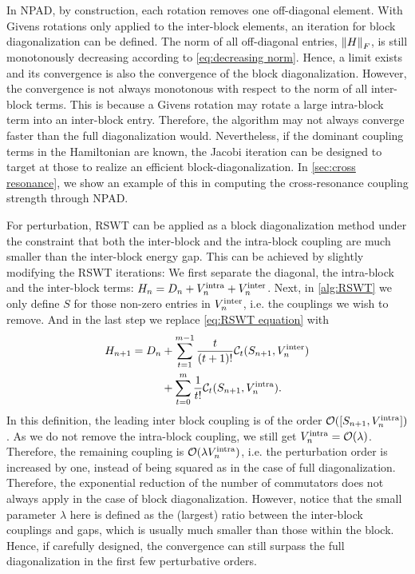 \documentclass[%
 reprint,
 amsmath,amssymb,
 aps,
pra,
noeprint,
superscriptaddress,
]{revtex4-2}
\begin{document}
In NPAD, by construction, each rotation removes one off-diagonal element.
With Givens rotations only applied to the inter-block elements, an iteration for block diagonalization can be defined.
The norm of all off-diagonal entries, $\norm{H}_F$, is still monotonously decreasing according to \cref{eq:decreasing norm}.
Hence, a limit exists and its convergence is also the convergence of the block diagonalization.
However, the convergence is not always monotonous with respect to the norm of all inter-block terms.
This is because a Givens rotation may rotate a large intra-block term into an inter-block entry.
Therefore, the algorithm may not always converge faster than the full diagonalization would.
Nevertheless, if the dominant coupling terms in the Hamiltonian are known, the Jacobi iteration can be designed to target at those to realize an efficient block-diagonalization.
In \cref{sec:cross resonance}, we show an example of this in computing the cross-resonance coupling strength through NPAD.


For perturbation, RSWT can be applied as a block diagonalization method under the constraint that both the inter-block and the intra-block coupling are much smaller than the inter-block energy gap.
This can be achieved by slightly modifying the RSWT iterations:
We first separate the diagonal, the intra-block and the inter-block terms: $H_n = D_n + V^{\rm{intra}}_n +  V^{\rm{inter}}_n $.
Next, in \cref{alg:RSWT} we only define $S$ for those non-zero entries in $V^{\textnormal{inter}}_n$, i.e. the couplings we wish to remove.
And in the last step we replace \cref{eq:RSWT equation} with 
\begin{align}
    H_{n+1} = 
    D_n
    &+
    \sum_{t=1}^{m-1}
    \frac{t}{(t+1)!}
    \mathcal{C}_t(S_{n+1}, V^{\rm{inter}}_n) \nonumber \\
    &+
    \sum_{t=0}^m
    \frac{1}{t!}
    \mathcal{C}_t(S_{n+1}, V^{\rm{intra}}_n)
    .
\end{align}
In this definition, the leading inter block coupling is of the order $\mathcal{O}([S_{n+1}, V^{\rm{intra}}_n])$.
As we do not remove the intra-block coupling, we still get $V^{\rm{intra}}_n=\mathcal{O}(\lambda)$.
Therefore, the remaining coupling is $\mathcal{O}(\lambda  V^{\rm{intra}}_n)$, i.e. the perturbation order is increased by one, instead of being squared as in the case of full diagonalization.
Therefore, the exponential reduction of the number of commutators does not always apply in the case of block diagonalization.
However, notice that the small parameter $\lambda$ here is defined as the (largest) ratio between the inter-block couplings and gaps, which is usually much smaller than those within the block.
Hence, if carefully designed, the convergence can still surpass the full diagonalization in the first few perturbative orders.
\end{document}
